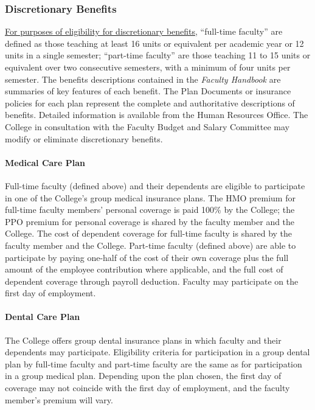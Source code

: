 		\subsubsection{Discretionary Benefits}
			\underline{For purposes of eligibility for discretionary benefits}, ``full-time faculty'' are defined as those teaching at least 16 units or equivalent per academic year or 12 units in a single semester; ``part-time faculty'' are those teaching 11 to 15 units or equivalent over two consecutive semesters, with a minimum of four units per semester.  The benefits descriptions contained in the \emph{Faculty Handbook} are summaries of key features of each benefit.  The Plan Documents or insurance policies for each plan represent the complete and authoritative descriptions of benefits.  Detailed information is available from the Human Resources Office.  The College in consultation with the Faculty Budget and Salary Committee may modify or eliminate discretionary benefits.
			\paragraph{Medical Care Plan}

				Full-time faculty (defined above) and their dependents are
				eligible to participate in one of the College's group medical
				insurance plans.  The HMO premium for full-time faculty members'
				personal coverage is paid 100\% by the College; the PPO premium
				for personal coverage is shared by the faculty member and the
				College.  The cost of dependent coverage for full-time
				faculty is shared by the faculty member and the College.
				Part-time faculty (defined above) are able to participate by
				paying one-half of the cost of their own coverage plus the
				full amount of the employee contribution where applicable,
				and the full cost of dependent coverage through payroll
				deduction.  Faculty may participate on the first day of
				employment.

			\paragraph{Dental Care Plan}

				The College offers group dental insurance plans in which faculty
				and their dependents may participate.  Eligibility criteria for
				participation in a group dental plan by full-time faculty and
				part-time faculty are the same as for participation in a group
				medical plan.  Depending upon the plan chosen, the first day of
				coverage may not coincide with the first day of employment, and
				the faculty member's premium will vary.

